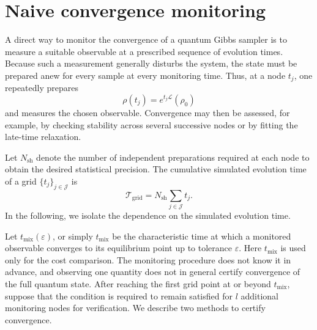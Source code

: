 \documentclass[showpacs,amsmath,amssymb,twocolumn,prx,superscriptaddress,10pt,aps,nofootinbib]{revtex4-2}
\begin{document}


\section{Naive convergence monitoring}
\label{app:Naive Method}

A direct way to monitor the convergence of a quantum Gibbs sampler is to measure a suitable observable at a prescribed sequence of evolution times. Because such a measurement generally disturbs the system, the state must be prepared anew for every sample at every monitoring time. Thus, at a node $t_j$, one repeatedly prepares
\begin{equation}
    \rho(t_j) = e^{t_j\mathcal{L}}\!\left(\rho_0\right)
\end{equation}
and measures the chosen observable. Convergence may then be assessed, for example, by checking stability across several successive nodes or by fitting the late-time relaxation.

Let $N_{\mathrm{sh}}$ denote the number of independent preparations required at each node to obtain the desired statistical precision. The cumulative simulated evolution time of a grid $\{t_j\}_{j\in\mathcal{J}}$ is
\begin{equation}
    \mathcal{T}_{\mathrm{grid}}
    =
    N_{\mathrm{sh}}
    \sum_{j\in\mathcal{J}} t_j .
    \label{eq:naive_grid_cost}
\end{equation}
In the following, we isolate the dependence on the simulated evolution time.

Let $t_{\mathrm{mix}}(\varepsilon)$, or simply $t_{\mathrm{mix}}$ be the characteristic time at which a monitored observable converges to its equilibrium point up to tolerance $\varepsilon$. Here $t_{\mathrm{mix}}$ is used only for the cost comparison. The monitoring procedure does not know it in advance, and observing one quantity does not in general certify convergence of the full quantum state. After reaching the first grid point at or beyond $t_{\mathrm{mix}}$, suppose that the condition is required to remain satisfied for $l$ additional monitoring nodes for verification. We describe two methods to certify convergence.
\end{document}
